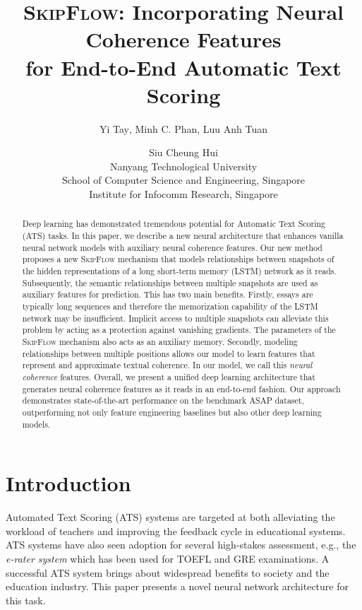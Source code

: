 \documentclass[letterpaper]{article}
\title{\textsc{SkipFlow:} Incorporating Neural Coherence Features \\ for End-to-End Automatic Text Scoring}
\author{Yi Tay\textsuperscript{}, Minh C. Phan\textsuperscript{}, Luu Anh Tuan\textsuperscript{} \and Siu Cheung Hui\textsuperscript{}\\
\textsuperscript{}\:Nanyang Technological University \\ School of Computer Science and Engineering, Singapore \\
\textsuperscript{}\:Institute for Infocomm Research, Singapore \\
}
\date{}
\begin{document}
\maketitle
\begin{abstract}
Deep learning has demonstrated tremendous potential for Automatic Text Scoring (ATS) tasks. In this paper, we describe a new neural architecture that enhances vanilla neural network models with auxiliary neural coherence features. Our new method proposes a new \textsc{SkipFlow} mechanism that models relationships between snapshots of the hidden representations of a long short-term memory (LSTM) network as it reads. Subsequently, the semantic relationships between multiple snapshots are used as auxiliary features for prediction. This has two main benefits. Firstly, essays are typically long sequences and therefore the memorization capability of the LSTM network may be insufficient. Implicit access to multiple snapshots can alleviate this problem by acting as a protection against vanishing gradients. The parameters of the \textsc{SkipFlow} mechanism also acts as an auxiliary memory. Secondly, modeling relationships between multiple positions allows our model to learn features that represent and approximate textual coherence. In our model, we call this \textit{neural coherence} features. Overall, we present a unified deep learning architecture that generates neural coherence features as it reads in an end-to-end fashion. Our approach demonstrates state-of-the-art performance on the benchmark ASAP dataset, outperforming not only feature engineering baselines but also other deep learning models. 
\end{abstract}

\section{Introduction}

Automated Text Scoring (ATS) systems are targeted at both alleviating the workload of teachers and improving the feedback cycle in educational systems. ATS systems have also seen adoption for several high-stakes assessment, e.g., the \textit{e-rater system} \cite{attali2004automated} which has been used for TOEFL and GRE examinations. A successful ATS system brings about widespread benefits to society and the education industry. This paper presents a novel neural network architecture for this task. 
\end{document}
